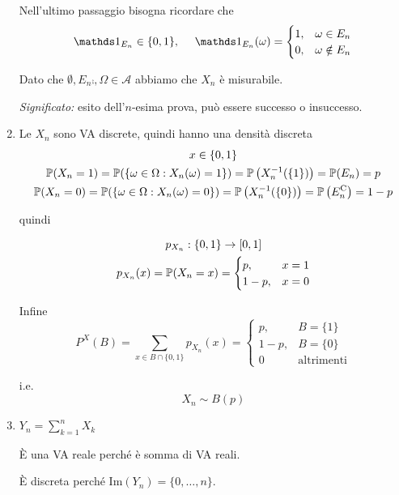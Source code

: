 \begin{enumerate}
Nell'ultimo passaggio bisogna ricordare che
\begin{equation*}
\Ind_{E_{n}} \in \{0,1\} ,\ \ \ \ \Ind_{E_{n}}( \omega ) =\begin{cases}
1, & \omega \in E_{n}\\
0, & \omega \notin E_{n}
\end{cases}
\end{equation*}

Dato che $\emptyset ,E_{n}\comp ,\Omega \in \mathcal{A}$ abbiamo che $X_{n}$ è misurabile.

\textit{Significato:} esito dell'$n$-esima prova, può essere successo o insuccesso.
\item Le $X_{n}$ sono VA discrete, quindi hanno una densità discreta
\begin{gather*}
x\in \{0,1\}\\
\mathbb{P}( X_{n} =1) =\mathbb{P}(\{\omega \in \Omega :X_{n}( \omega ) =1\}) =\mathbb{P}\left( X_{n}^{-1}(\{1\})\right) =\mathbb{P}( E_{n}) =p\\
\mathbb{P}( X_{n} =0) =\mathbb{P}(\{\omega \in \Omega :X_{n}( \omega ) =0\}) =\mathbb{P}\left( X_{n}^{-1}(\{0\})\right) =\mathbb{P}\left( E_{n}^{\mathrm{C}}\right) =1-p
\end{gather*}

quindi

\begin{gather*}
p_{X_{n}} :\{0,1\}\rightarrow [ 0,1]\\
p_{X_{n}}( x) =\mathbb{P}( X_{n} =x) =\begin{cases}
p, & x=1\\
1-p, & x=0
\end{cases}
\end{gather*}

Infine
\begin{equation*}
P^{X}( B) =\sum\limits _{x\in B\cap \{0,1\}} p_{X_{n}}( x) =\begin{cases}
p, & B=\{1\}\\
1-p, & B=\{0\}\\
0 & \text{altrimenti}
\end{cases}
\end{equation*}

i.e.\begin{equation*}
\boxed{X_{n} \sim B( p)}
\end{equation*}
\item $Y_{n} =\sum\limits _{k=1}^{n} X_{k}$

È una VA reale perché è somma di VA reali.

È discreta perché $\mathrm{Im}( Y_{n}) =\{0,\dots ,n\}$.


\end{enumerate}

